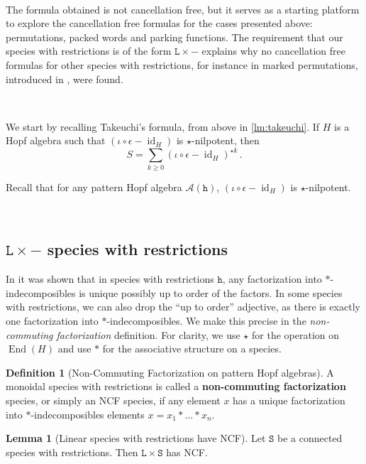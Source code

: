 \documentclass[12pt, reqno]{amsart}
\theoremstyle{definition}
\newtheorem{lm}[thm]{Lemma}
\newtheorem{defin}[thm]{Definition}
\DeclareMathOperator{\id}{id}
\DeclareMathOperator{\End}{\mathrm{End}}
\begin{document}
\

The formula obtained is not cancellation free, but it serves as a starting platform to explore the cancellation free formulas for the cases presented above: permutations, packed words and parking functions. The requirement that our species with restrictions is of the form $\mathtt{L} \times -$ explains why no cancellation free formulas for other species with restrictions, for instance in marked permutations, introduced in \cite{Penaguiao2020}, were found.

\

We start by recalling Takeuchi's formula, from above in \cref{lm:takeuchi}.
If $H$ is a Hopf algebra such that $(  \iota  \circ\epsilon - \id_H)$ is $\star$-nilpotent, then 
$$S = \sum_{k\geq 0 }  ( \iota  \circ\epsilon- \id_H)^{\star k}\, . $$

Recall that for any pattern Hopf algebra $\mathcal A (\mathtt{h})$, $(\iota\circ \epsilon - \id_H)$ is $\star$-nilpotent. 

\

\subsection{$\mathtt{L}\times -$ species with restrictions}


In \cite[Corollary 4.4.]{Penaguiao2020} it was shown that in species with restrictions $\mathtt{h}$, any factorization into $\ast$-indecomposibles is unique possibly up to order of the factors.
In some species with restrictions, we can also drop the ``up to order'' adjective, as there is exactly one factorization into $\ast$-indecomposibles. We make this precise in the \textit{non-commuting factorization} definition.
For clarity, we use $\star$ for the operation on $\End (H)$ and use $\ast $ for the associative structure on a species.



\begin{defin}[Non-Commuting Factorization on pattern Hopf algebras]\label{defin:ncf}
A monoidal species with restrictions is called a \textbf{non-commuting factorization} species, or simply an NCF species, if any element $x$ has a unique factorization into $\ast$-indecomposibles elements $x = x_1 \ast \dots \ast x_n$.
\end{defin}


\begin{lm}[Linear species with restrictions have NCF]
Let $\mathtt{S}$ be a connected species with restrictions.
Then $\mathtt{L} \times \mathtt{S}$ has NCF.
\end{lm}
\end{document}
